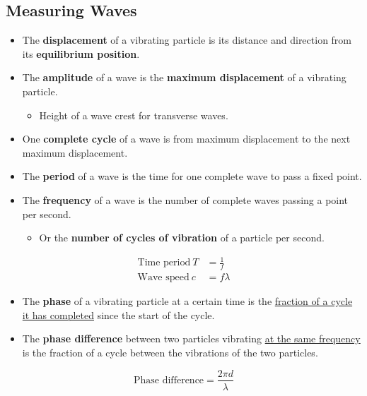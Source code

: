 \subsection{Measuring Waves}

\begin{itemize}
    \item The \textbf{displacement} of a vibrating particle is its distance and direction from its \textbf{equilibrium position}.
    \item The \textbf{amplitude} of a wave is the \textbf{maximum displacement} of a vibrating particle.
        \begin{itemize}
            \item Height of a wave crest for transverse waves.
        \end{itemize}
    \item One \textbf{complete cycle} of a wave is from maximum displacement to the next maximum displacement.
    \item The \textbf{period} of a wave is the time for one complete wave to pass a fixed point.
    \item The \textbf{frequency} of a wave is the number of complete waves passing a point per second.
        \begin{itemize}
            \item Or the \textbf{number of cycles of vibration} of a particle per second.
        \end{itemize}
\end{itemize}
\begin{align*}
    \text{Time period}\ T&=\frac{1}{f}\\
    \text{Wave speed}\ c&=f\lambda
\end{align*}

\begin{itemize}
    \item The \textbf{phase} of a vibrating particle at a certain time is the \underline{fraction of a cycle it has completed} since the start of the cycle.
    \item The \textbf{phase difference} between two particles vibrating \underline{at the same frequency} is the fraction of a cycle between the vibrations of the two particles.
\end{itemize}
$$\text{Phase difference}=\frac{2\pi d}{\lambda}$$
